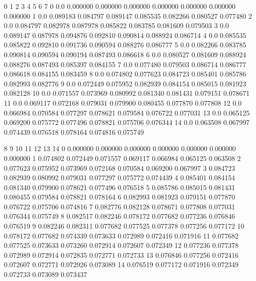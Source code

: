 \documentclass[letterpaper,10pt,english]{sphinxmanual}
\begin{document}
\begin{sphinxVerbatim}[commandchars=\\\{\}]
     0         1         2         3         4         5         6         7   \PYGZbs{}
0   0.0  0.000000  0.000000  0.000000  0.000000  0.000000  0.000000  0.000000   
1   0.0  0.089183  0.084797  0.089147  0.085535  0.082266  0.080527  0.077480   
2   0.0  0.084797  0.082978  0.087978  0.085822  0.083785  0.081609  0.079503   
3   0.0  0.089147  0.087978  0.094876  0.092810  0.090814  0.088924  0.086714   
4   0.0  0.085535  0.085822  0.092810  0.091736  0.090594  0.088276  0.086777   
5   0.0  0.082266  0.083785  0.090814  0.090594  0.090194  0.087493  0.086618   
6   0.0  0.080527  0.081609  0.088924  0.088276  0.087493  0.085397  0.084155   
7   0.0  0.077480  0.079503  0.086714  0.086777  0.086618  0.084155  0.083459   
8   0.0  0.074802  0.077623  0.084723  0.085401  0.085786  0.082993  0.082776   
9   0.0  0.072449  0.075952  0.082939  0.084154  0.085015  0.081923  0.082128   
10  0.0  0.071557  0.073969  0.080992  0.081340  0.081431  0.079151  0.078671   
11  0.0  0.069117  0.072168  0.079031  0.079900  0.080455  0.077870  0.077808   
12  0.0  0.066984  0.070584  0.077297  0.078621  0.079584  0.076722  0.077031   
13  0.0  0.065125  0.069200  0.075772  0.077496  0.078821  0.075706  0.076344   
14  0.0  0.063508  0.067997  0.074439  0.076518  0.078164  0.074816  0.075749   

          8         9         10        11        12        13        14  
0   0.000000  0.000000  0.000000  0.000000  0.000000  0.000000  0.000000  
1   0.074802  0.072449  0.071557  0.069117  0.066984  0.065125  0.063508  
2   0.077623  0.075952  0.073969  0.072168  0.070584  0.069200  0.067997  
3   0.084723  0.082939  0.080992  0.079031  0.077297  0.075772  0.074439  
4   0.085401  0.084154  0.081340  0.079900  0.078621  0.077496  0.076518  
5   0.085786  0.085015  0.081431  0.080455  0.079584  0.078821  0.078164  
6   0.082993  0.081923  0.079151  0.077870  0.076722  0.075706  0.074816  
7   0.082776  0.082128  0.078671  0.077808  0.077031  0.076344  0.075749  
8   0.082517  0.082246  0.078172  0.077682  0.077236  0.076846  0.076519  
9   0.082246  0.082311  0.077682  0.077525  0.077378  0.077256  0.077172  
10  0.078172  0.077682  0.074339  0.073633  0.072989  0.072416  0.071916  
11  0.077682  0.077525  0.073633  0.073260  0.072914  0.072607  0.072349  
12  0.077236  0.077378  0.072989  0.072914  0.072835  0.072771  0.072733  
13  0.076846  0.077256  0.072416  0.072607  0.072771  0.072926  0.073089  
14  0.076519  0.077172  0.071916  0.072349  0.072733  0.073089  0.073437  
\end{sphinxVerbatim}
\end{document}
